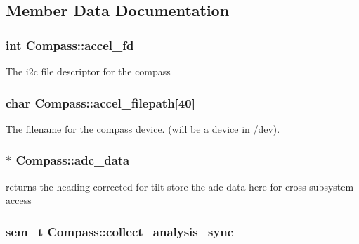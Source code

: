 \subsection{Member Data Documentation}
\hypertarget{classCompass_a2a55ab6b29ea9ddca507a948cb30d42b}{
\subsubsection[{accel\-\_\-fd}]{\setlength{\rightskip}{0pt plus 5cm}int Compass\-::accel\-\_\-fd\hspace{0.3cm}{\ttfamily [protected]}}}\label{classCompass_a2a55ab6b29ea9ddca507a948cb30d42b}
The i2c file descriptor for the compass \hypertarget{classCompass_a69f89e1a0d7c769e02cd3704904e40fd}{
\subsubsection[{accel\-\_\-filepath}]{\setlength{\rightskip}{0pt plus 5cm}char Compass\-::accel\-\_\-filepath\mbox{[}40\mbox{]}\hspace{0.3cm}{\ttfamily [protected]}}}\label{classCompass_a69f89e1a0d7c769e02cd3704904e40fd}
The filename for the compass device. (will be a device in /dev). \hypertarget{classCompass_a72a3d0e853685bdbc6758120ebd10800}{
\subsubsection[{adc\-\_\-data}]{$\ast$ Compass\-::adc\-\_\-data\hspace{0.3cm}{\ttfamily [protected]}}}\label{classCompass_a72a3d0e853685bdbc6758120ebd10800}
returns the heading corrected for tilt store the adc data here for cross subsystem access \hypertarget{classCompass_ace6e13b91461366609f093fef09188d9}{
\subsubsection[{collect\-\_\-analysis\-\_\-sync}]{\setlength{\rightskip}{0pt plus 5cm}sem\-\_\-t Compass\-::collect\-\_\-analysis\-\_\-sync\hspace{0.3cm}{\ttfamily [protected]}}}\label{classCompass_ace6e13b91461366609f093fef09188d9}
